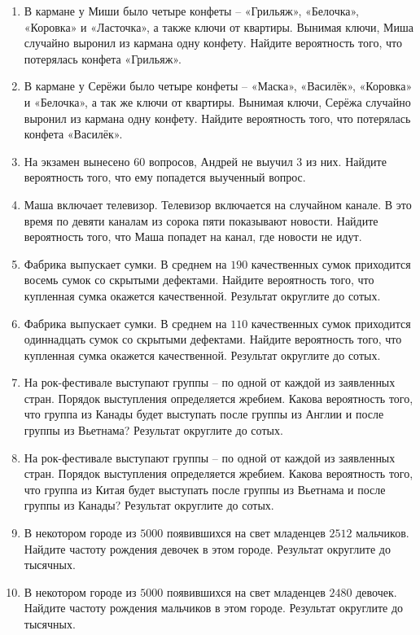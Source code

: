 \documentclass[12pt, a4paper]{article}
\begin{document}
	
	\begin{enumerate}
		\item В кармане у Миши было четыре конфеты – «Грильяж», «Белочка», «Коровка» и «Ласточка», а также ключи от квартиры. Вынимая ключи, Миша случайно выронил из кармана одну конфету. Найдите вероятность того, что потерялась конфета «Грильяж».
		\item В кармане у Серёжи было четыре конфеты – «Маска», «Василёк», «Коровка» и «Белочка», а так же ключи от квартиры. Вынимая ключи, Серёжа случайно выронил из кармана одну конфету. Найдите вероятность того, что потерялась конфета «Василёк».
		\item На экзамен вынесено \( 60 \) вопросов, Андрей не выучил \( 3 \) из них. Найдите вероятность того, что ему попадется выученный вопрос.
		\item Маша включает телевизор. Телевизор включается на случайном канале. В это время по девяти каналам из сорока пяти показывают новости. Найдите вероятность того, что Маша попадет на канал, где новости не идут.
		\item Фабрика выпускает сумки. В среднем на \( 190 \) качественных сумок приходится восемь сумок со скрытыми дефектами. Найдите вероятность того, что купленная сумка окажется качественной. Результат округлите до сотых.
		\item Фабрика выпускает сумки. В среднем на \( 110 \) качественных сумок приходится одиннадцать сумок со скрытыми дефектами. Найдите вероятность того, что купленная сумка окажется качественной. Результат округлите до сотых.
		\item На рок-фестивале выступают группы – по одной от каждой из заявленных стран. Порядок выступления определяется жребием. Какова вероятность того, что группа из Канады будет выступать после группы из Англии и после группы из Вьетнама? Результат округлите до сотых.
		\item На рок-фестивале выступают группы – по одной от каждой из заявленных стран. Порядок выступления определяется жребием. Какова вероятность того, что группа из Китая будет выступать после группы из Вьетнама и после группы из Канады? Результат округлите до сотых.
		\item В некотором городе из \( 5000 \) появившихся на свет младенцев \( 2512 \) мальчиков. Найдите частоту рождения девочек в этом городе. Результат округлите до тысячных.
		\item В некотором городе из \( 5000 \) появившихся на свет младенцев \( 2480 \) девочек. Найдите частоту рождения мальчиков в этом городе. Результат округлите до тысячных.

\end{enumerate}
\end{document}
